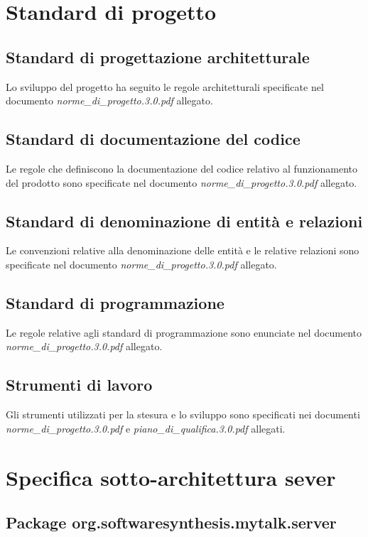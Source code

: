 \section{Standard di progetto}

\subsection{Standard di progettazione architetturale}
Lo sviluppo del progetto ha seguito le regole architetturali specificate nel documento  \textit{norme\_di\_progetto.3.0.pdf} allegato.

\subsection{Standard di documentazione del codice}
Le regole che definiscono la documentazione del codice relativo al funzionamento del prodotto sono specificate nel documento \textit{norme\_di\_progetto.3.0.pdf} allegato.

\subsection{Standard di denominazione di entità e relazioni}
Le convenzioni relative alla denominazione delle entità e le relative relazioni sono specificate nel documento \textit{norme\_di\_progetto.3.0.pdf} allegato.

\subsection{Standard di programmazione}
Le regole relative agli standard di programmazione sono enunciate nel documento \textit{norme\_di\_progetto.3.0.pdf} allegato.

\subsection{Strumenti di lavoro}
Gli strumenti utilizzati per la stesura e lo sviluppo sono specificati nei documenti \textit{norme\_di\_progetto.3.0.pdf} e \textit{piano\_di\_qualifica.3.0.pdf} allegati.

\clearpage

\section{Specifica sotto-architettura sever}\label{sec:serverarchitecture}

\subsection{Package org.softwaresynthesis.mytalk.server}\label{sec:server}

